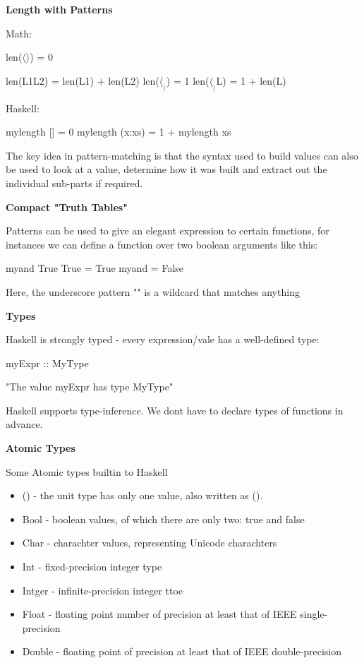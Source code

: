 \documentclass{article}
\begin{document}
\textbf{Length with Patterns}

Math:

len($\langle \rangle$) = 0

len(L1L2) = len(L1) + len(L2)
len($\langle _ \rangle$) = 1
len($\langle _ \rangle$L) = 1 + len(L)

Haskell:

mylength [] = 0
mylength (x:xs) = 1 + mylength xs

The key idea in pattern-matching is that the syntax used to build values can also be used to look at a value, determine how it was built and extract out the individual sub-parts if required.


\textbf{Compact "Truth Tables"}

Patterns can be used to give an elegant expression to certain functions, for instances we can define a function over two boolean arguments like this:

myand True True = True
myand \textunderscore       \textunderscore = False

Here, the underscore pattern "\textunderscore" is a wildcard that matches anything


\textbf{Types}

Haskell is strongly typed - every expression/vale has a well-defined type:

 myExpr :: MyType

"The value myExpr has type MyType"

Haskell supports type-inference. We dont have to declare types of functions in advance.


\textbf{Atomic Types}

Some Atomic types builtin to Haskell

\begin{itemize}
\item () - the unit type has only one value, also written as ().
\item Bool - boolean values, of which there are only two: true and false
\item Char - charachter values, representing Unicode charachters
\item Int - fixed-precision integer type
\item Intger - infinite-precision integer ttoe
\item Float - floating point number of precision at least that of IEEE single-precision
\item Double - floating point of precision at least that of IEEE double-precision
\end{itemize}
\end{document}
